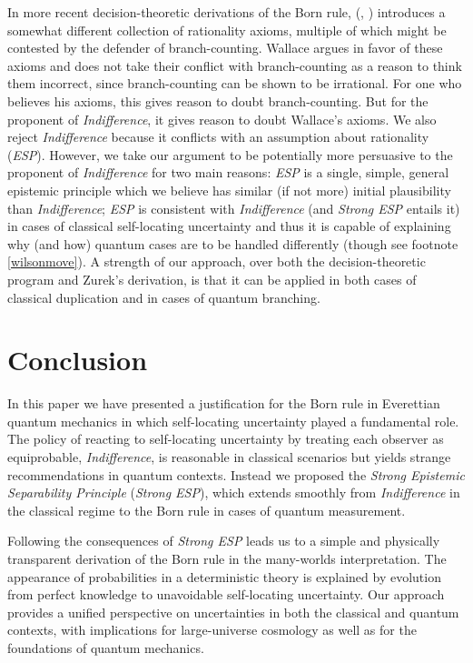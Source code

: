 \documentclass[onecolumn,secnumarabic,amsmath,amssymb,balancelastpage,nofootinbib]{article}
\begin{document}
In more recent decision-theoretic derivations of the Born rule, \citeauthor{wallace2010b} (\citeyear{wallace2010b}, \citeyear{wallace2012}) introduces a somewhat different collection of rationality axioms, multiple of which might be contested by the defender of branch-counting.  Wallace argues in favor of these axioms and does not take their conflict with branch-counting \citep[.1]{wallace2012} as a reason to think them incorrect, since branch-counting can be shown to be irrational.  For one who believes his axioms, this gives reason to doubt branch-counting.  But for the proponent of \emph{Indifference}, it gives reason to doubt Wallace's axioms. {We also reject \emph{Indifference} because it conflicts with an assumption about rationality (\emph{ESP}).  However, we take our argument to be potentially more persuasive to the proponent of \emph{Indifference} for two main reasons: \emph{ESP} is a single, simple, general epistemic principle which we believe has similar (if not more) initial plausibility than \emph{Indifference}; \emph{ESP} is consistent with \emph{Indifference} (and \emph{Strong ESP} entails it) in cases of classical self-locating uncertainty and thus it is capable of explaining why (and how) quantum cases are to be handled differently (though see footnote \ref{wilsonmove}).}  A strength of our approach, over both the decision-theoretic program and Zurek's derivation, is that it can be applied in both cases of classical duplication {and} in cases of quantum branching.

\section{Conclusion}

In this paper we have presented a justification for the Born rule in Everettian quantum mechanics in which self-locating uncertainty played a fundamental role. {The policy of reacting to self-locating uncertainty by treating each observer as equiprobable, \emph{Indifference}, is reasonable in classical scenarios but yields strange recommendations in quantum contexts.} Instead we proposed the \emph{Strong Epistemic Separability Principle} (\emph{Strong ESP}), which extends smoothly from \emph{Indifference} in the classical regime to the Born rule in cases of quantum measurement.

Following the consequences of \emph{Strong ESP} leads us to a simple and physically transparent derivation of the Born rule in the many-worlds interpretation. The appearance of probabilities in a deterministic theory is explained by evolution from perfect knowledge to unavoidable self-locating uncertainty. Our approach provides a unified perspective on uncertainties in both the classical and quantum contexts, with implications for large-universe cosmology as well as for the foundations of quantum mechanics.
\end{document}
